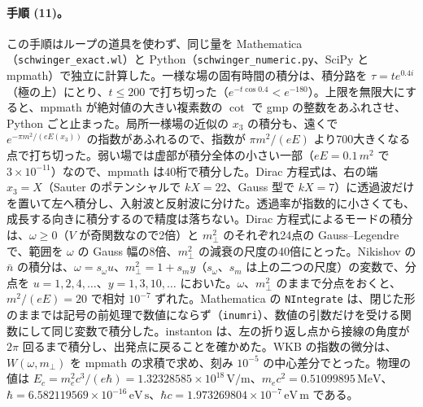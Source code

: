 \documentclass[a4paper,10pt]{ltjsarticle}
\begin{document}
\paragraph{手順 (11)。}この手順はループの道具を使わず、同じ量を Mathematica（\texttt{schwinger\_exact.wl}）と Python（\texttt{schwinger\_numeric.py}、SciPy と mpmath）で独立に計算した。一様な場の固有時間の積分は、積分路を $\tau=te^{0.4i}$（極の上）にとり、$t\le200$ で打ち切った（$e^{-t\cos0.4}<e^{-180}$）。上限を無限大にすると、mpmath が絶対値の大きい複素数の $\cot$ で gmp の整数をあふれさせ、Python ごと止まった。局所一様場の近似の $x_3$ の積分も、遠くで $e^{-\pi m^2/(eE(x_3))}$ の指数があふれるので、指数が $\pi m^2/(eE)$ より700大きくなる点で打ち切った。弱い場では虚部が積分全体の小さい一部（$eE=0.1\,m^2$ で $3\times10^{-11}$）なので、mpmath は40桁で積分した。Dirac 方程式は、右の端 $x_3=X$（Sauter のポテンシャルで $kX=22$、Gauss 型で $kX=7$）に透過波だけを置いて左へ積分し、入射波と反射波に分けた。透過率が指数的に小さくても、成長する向きに積分するので精度は落ちない。Dirac 方程式によるモードの積分は、$\omega\ge0$（$V$ が奇関数なので2倍）と $m_\perp^2$ のそれぞれ24点の Gauss--Legendre で、範囲を $\omega$ の Gauss 幅の8倍、$m_\perp^2$ の減衰の尺度の40倍にとった。Nikishov の $\bar n$ の積分は、$\omega=s_\omega u$、$m_\perp^2=1+s_my$（$s_\omega$、$s_m$ は上の二つの尺度）の変数で、分点を $u=1,2,4,\dots$、$y=1,3,10,\dots$ においた。$\omega$、$m_\perp^2$ のままで分点をおくと、$m^2/(eE)=20$ で相対 $10^{-7}$ ずれた。Mathematica の \texttt{NIntegrate} は、閉じた形のままでは記号の前処理で数値にならず（\texttt{inumri}）、数値の引数だけを受ける関数にして同じ変数で積分した。instanton は、左の折り返し点から接線の角度が $2\pi$ 回るまで積分し、出発点に戻ることを確かめた。WKB の指数の微分は、$W(\omega,m_\perp)$ を mpmath の求積で求め、刻み $10^{-5}$ の中心差分でとった。物理の値は $E_c=m_e^2c^3/(e\hbar)=1.32328585\times10^{18}\,\mathrm{V/m}$、$m_ec^2=0.51099895\,\mathrm{MeV}$、$\hbar=6.582119569\times10^{-16}\,\mathrm{eV\,s}$、$\hbar c=1.973269804\times10^{-7}\,\mathrm{eV\,m}$ である。
\end{document}
